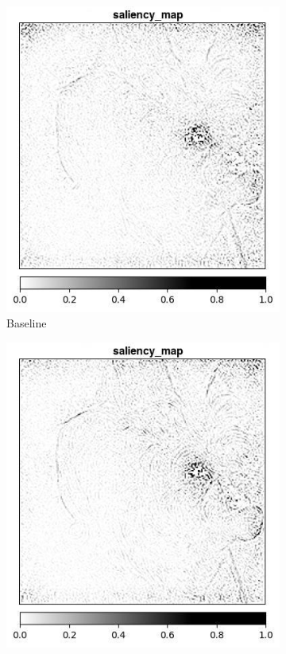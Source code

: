 \begin{figure}[h]
  \centering
 \begin{subfigure}{.3\textwidth}
    \centering
    \includegraphics[width=\textwidth]{methods/images/cairn-none.jpg}
    \caption{Baseline}\label{fig:ssim-carin-none}
\end{subfigure}
 \begin{subfigure}{.3\textwidth}
    \centering
    \includegraphics[width=\textwidth]{methods/images/cairn-sharp.jpg}

\end{subfigure}
\end{figure}
